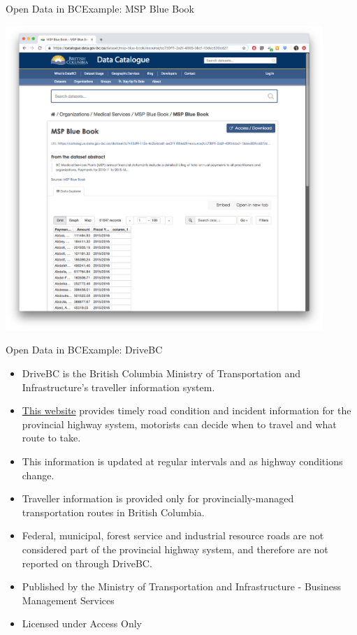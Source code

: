 \documentclass[xcolor=svgnames]{beamer}
\begin{document}
\begin{frame}{Open Data in BC}{Example: MSP Blue Book}
\begin{center}
\includegraphics[width=0.9\textwidth]{img/MSPBlueBook}
\end{center}
\end{frame}



\begin{frame}{Open Data in BC}{Example: DriveBC}
\begin{itemize}
\item DriveBC is the British Columbia Ministry of Transportation and Infrastructure's traveller information system. 
\item \href{https://catalogue.data.gov.bc.ca/dataset/drivebc}{This website} provides timely road condition and incident information for the provincial highway system, motorists can decide when to travel and what route to take.
\item  This information is updated at regular intervals and as highway conditions change. 
\item Traveller information is provided only for provincially-managed transportation routes in British Columbia.
\item  Federal, municipal, forest service and industrial resource roads are not considered part of the provincial highway system, and therefore are not reported on through DriveBC.
\item Published by the Ministry of Transportation and Infrastructure - Business Management Services 
\item Licensed under Access Only
\end{itemize}
\end{frame}
\end{document}
